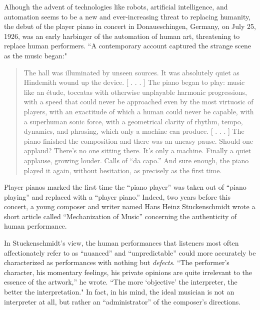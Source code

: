\documentclass[titlepage,14pt]{article}
\begin{document}
\begin{doublespace}
Alhough the advent of technologies like robots, artificial intelligence, and automation seems to be a new and ever-increasing threat to replacing humanity, 
\autocite{robots} the debut of the player piano in concert in Donaueschingen, Germany, on July 25, 1926, was an early harbinger of the automation of human art, threatening to replace human performers. \autocite{playerpiano} ``A contemporary account captured the strange scene as the music began:"

\begin{quote}
The hall was illuminated by unseen sources. It was absolutely quiet as Hindemith wound up the device. [ . . . ] The piano began to play: music like an \'etude, toccatas with otherwise unplayable harmonic progressions, with a speed that could never be approached even by the most virtuosic of players, with an exactitude of which a human could never be capable, with a superhuman sonic force, with a geometrical clarity of rhythm, tempo, dynamics, and phrasing, which only a machine can produce. [ . . . ] The piano finished the composition and there was an uneasy pause. Should one applaud? There's no one sitting there. It's only a machine. Finally a quiet applause, growing louder. Calls of ``da capo.'' And sure enough, the piano played it again, without hesitation, as precisely as the first time.\autocite{playerpiano}
\end{quote}

Player pianos marked the first time the ``piano player'' was taken out of ``piano playing'' and replaced with a ``player piano.'' \autocite{playerpiano} Indeed, two years before this concert, a young composer and writer named Hans Heinz Stuckenschmidt wrote a short article called ``Mechanization of Music'' concerning the authenticity of human performance.\autocite{playerpiano}

In Stuckenschmidt's view, the human performances that listeners most often affectionately refer to as ``nuanced'' and ``unpredictable'' could more accurately be characterized as performances with nothing but \textit{defects}. ``The performer's character, his momentary feelings, his private opinions are quite irrelevant to the essence of the artwork,'' he wrote. ``The more `objective' the interpreter, the better the interpretation."\autocite{playerpiano} In fact, in his mind, the ideal musician is not an interpreter at all, but rather an ``administrator'' of the composer's directions. \autocite{playerpiano}


\end{doublespace}
\end{document}
